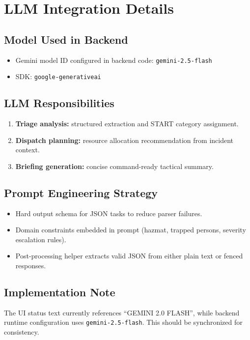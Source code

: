 \documentclass[12pt,a4paper]{article}
\begin{document}
\section{LLM Integration Details}
\subsection{Model Used in Backend}
\begin{itemize}[leftmargin=1.5em]
  \item Gemini model ID configured in backend code: \texttt{gemini-2.5-flash}
  \item SDK: \texttt{google-generativeai}
\end{itemize}

\subsection{LLM Responsibilities}
\begin{enumerate}[leftmargin=1.5em]
  \item \textbf{Triage analysis:} structured extraction and START category assignment.
  \item \textbf{Dispatch planning:} resource allocation recommendation from incident context.
  \item \textbf{Briefing generation:} concise command-ready tactical summary.
\end{enumerate}

\subsection{Prompt Engineering Strategy}
\begin{itemize}[leftmargin=1.5em]
  \item Hard output schema for JSON tasks to reduce parser failures.
  \item Domain constraints embedded in prompt (hazmat, trapped persons, severity escalation rules).
  \item Post-processing helper extracts valid JSON from either plain text or fenced responses.
\end{itemize}

\subsection{Implementation Note}
The UI status text currently references ``GEMINI 2.0 FLASH'', while backend runtime configuration uses \texttt{gemini-2.5-flash}. This should be synchronized for consistency.
\end{document}
